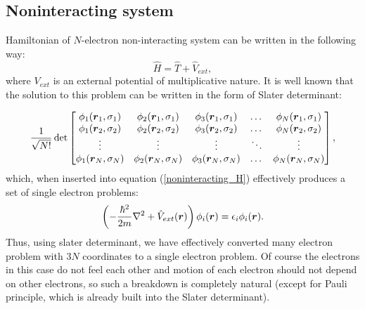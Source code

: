 \documentclass[openany, longbibliography,slovene,a4paper,12pt]{article}
\def\vec#1{\mbox{\boldmath$#1$}}
\begin{document}
\subsection{Noninteracting system}
Hamiltonian of $N$-electron non-interacting system can be written in the
following way:
 \begin{equation} \label{noninteracting_H}
   \hat H =\hat  T + \hat V_{ext}, 
 \end{equation}
 where $V_{ext}$ is an external potential of multiplicative nature. It is well
 known that the solution to this problem can be written in the form of Slater determinant:

 \[
      \frac{1}{\sqrt{N!}}\det 
   \begin{bmatrix}
   \phi_{1}(\vec r_1, \sigma_1) & \phi_{2}(\vec r_1, \sigma_1) & \phi_{3}(\vec
   r_1, \sigma_1) & \dots & \phi_{N}(\vec r_1, \sigma_1) \\
    \phi_{1}(\vec r_2, \sigma_2) & \phi_{2}(\vec r_2, \sigma_2) & \phi_{3}(\vec
    r_2, \sigma_2) & \dots & \phi_{N}(\vec r_2, \sigma_2) \\
    \vdots & \vdots & \vdots & \ddots & \vdots \\
     \phi_{1}(\vec r_N, \sigma_N) & \phi_{2}(\vec r_N, \sigma_N) & \phi_{3}(\vec r_N, \sigma_N) & \dots & \phi_{N}(\vec r_N, \sigma_N) \\
\end{bmatrix},
\]
 which, when inserted into equation (\ref{noninteracting_H}) effectively produces
a set of single electron problems:
 \begin{equation}
   \left(-\frac{\hbar^2}{2m}\nabla^2 + \hat V_{ext}(\vec r)\right) \phi_i (\vec r) = \epsilon_i \phi_i(\vec r).
 \end{equation}
 Thus, using slater determinant, we have effectively converted many electron
 problem with $3N$ coordinates to a single electron problem. Of course the
 electrons in this case do not feel each other and motion of each electron
 should not depend on other electrons, so such a breakdown is completely natural
 (except for Pauli principle, which is already built into the Slater determinant).
 
\end{document}

